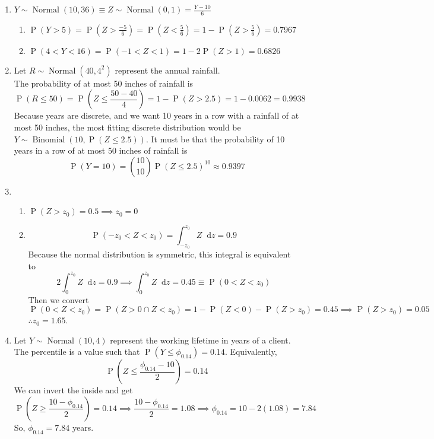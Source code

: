 \documentclass{article}
\title{\MakeUppercase{\jobname}}
\author{Justin Nguyen}
\date{\today}
\newcommand{\pr}[1]{\operatorname{P}\left(#1\right)}
\newcommand{\binomdist}[3]{#1 \sim \operatorname{Binomial}(#2, #3)}
\newcommand{\normdist}[3]{#1 \sim \operatorname{Normal}(#2, #3)}
\newcommand*\diff{\mathop{}\!\mathrm{d}}
\newcommand{\intv}[4]{\int_{#3}^{#4} #1 \diff #2}
\begin{document}
\maketitle


\begin{enumerate}
  \item $\normdist{Y}{10}{36} \equiv \normdist{Z}{0}{1} = \frac{Y - 10}{6}$
  \begin{enumerate}
    \item $\pr{Y > 5} 
    = \pr{Z > \frac{-5}{6}} = \pr{Z < \frac{5}{6}} = 1 - \pr{Z > \frac{5}{6}} = 0.7967$
    \item $\pr{4 < Y < 16} = \pr{-1 < Z < 1} = 1 - 2\pr{Z > 1} = 0.6826$
  \end{enumerate}
  
  \item Let $\normdist{R}{40}{4^2}$ represent the annual rainfall.\\
  The probability of at most 50 inches of rainfall is \[
    \pr{R \leq 50} = \pr{Z \leq \frac{50 - 40}{4}} = 1 - \pr{Z > 2.5} = 1 - 0.0062 = 0.9938
  \]
  Because years are discrete, and we want 10 years
  in a row with a rainfall of at most 50 inches, the most fitting discrete distribution
  would be $\binomdist{Y}{10}{\pr{Z \leq 2.5}}$. It must be that the probability of
  10 years in a row of at most 50 inches of rainfall is \[
    \pr{Y = 10} = \binom{10}{10}\pr{Z \leq 2.5}^{10} \approx 0.9397
  \]
  \item \begin{enumerate}
    \item $\pr{Z > z_0} = 0.5 \implies z_0 = 0$
    \item \[
      \pr{-z_0 < Z < z_0} = \intv{Z}{z}{-z_0}{z_0} = 0.9
    \]
    Because the normal distribution is symmetric, this integral is equivalent to \[
      2\intv{Z}{z}{0}{z_0} = 0.9 \implies \intv{Z}{z}{0}{z_0} = 0.45 \equiv \pr{0 < Z < z_0}
    \]
    Then we convert \[
      \pr{0 < Z < z_0} = \pr{Z > 0 \cap Z < z_0} = 1 - \pr{Z < 0} - \pr{Z > z_0} = 0.45
      \implies \pr{Z > z_0} = 0.05
    \]
    $\therefore z_0 = 1.65$.
  \end{enumerate}

  \item Let $\normdist{Y}{10}{4}$ represent the working lifetime in years of a client.
  The  percentile is a value such that $\pr{Y \leq \phi_{0.14}} = 0.14$.
  Equivalently, \[
    \pr{Z \leq \frac{\phi_{0.14} - 10}{2}} = 0.14
  \]
  We can invert the inside and get \[
    \pr{Z \geq \frac{10 - \phi_{0.14}}{2}} = 0.14 \implies
    \frac{10 - \phi_{0.14}}{2} = 1.08 \implies \phi_{0.14} = 10-2(1.08) = 7.84
  \]
  So, $\phi_{0.14} = 7.84$ years.


\end{enumerate}
\end{document}
